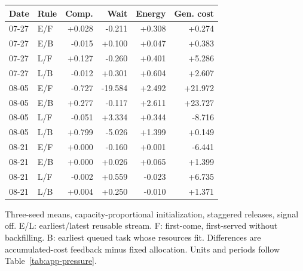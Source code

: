 \par\medskip\Needspace{226pt}
\noindent\begin{minipage}{\textwidth}
\centering\footnotesize\setlength{\tabcolsep}{3pt}\renewcommand{\arraystretch}{1.13}
\label{tab:structural-sensitivity}
\begin{tabular*}{\textwidth}{@{\extracolsep{\fill}}llrrrr@{}}
\toprule
Date & Rule & Comp. & Wait & Energy & Gen. cost\\
\midrule
07-27 & E/F & +0.028 & -0.211 & +0.308 & +0.274\\
07-27 & E/B & -0.015 & +0.100 & +0.047 & +0.383\\
07-27 & L/F & +0.127 & -0.260 & +0.401 & +5.286\\
07-27 & L/B & -0.012 & +0.301 & +0.604 & +2.607\\
08-05 & E/F & -0.727 & -19.584 & +2.492 & +21.972\\
08-05 & E/B & +0.277 & -0.117 & +2.611 & +23.727\\
08-05 & L/F & -0.051 & +3.334 & +0.344 & -8.716\\
08-05 & L/B & +0.799 & -5.026 & +1.399 & +0.149\\
08-21 & E/F & +0.000 & -0.160 & +0.001 & -6.441\\
08-21 & E/B & +0.000 & +0.026 & +0.065 & +1.399\\
08-21 & L/F & -0.002 & +0.559 & -0.023 & +6.735\\
08-21 & L/B & +0.004 & +0.250 & -0.010 & +1.371\\
\bottomrule\end{tabular*}
\par\smallskip\raggedright Three-seed means, capacity-proportional initialization, staggered releases, signal off. E/L: earliest/latest reusable stream. F: first-come, first-served without backfilling. B: earliest queued task whose resources fit. Differences are accumulated-cost feedback minus fixed allocation. Units and periods follow Table~\ref{tab:app-pressure}.
\end{minipage}\par\medskip
